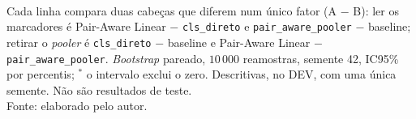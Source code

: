 \begin{table}[htbp]
{}\\[2pt]
  {\footnotesize Cada linha compara duas cabeças que diferem num único fator (A $-$ B): ler os marcadores é Pair-Aware Linear $-$ \texttt{cls\_direto} e \texttt{pair\_aware\_pooler} $-$ baseline; retirar o \emph{pooler} é \texttt{cls\_direto} $-$ baseline e Pair-Aware Linear $-$ \texttt{pair\_aware\_pooler}. \emph{Bootstrap} pareado, $10\,000$ reamostras, semente 42, IC95\% por percentis; $^{\ast}$ o intervalo exclui o zero. Descritivas, no DEV, com uma única semente. Não são resultados de teste.}\\[4pt]
  {\footnotesize Fonte: elaborado pelo autor.}
\end{table}
